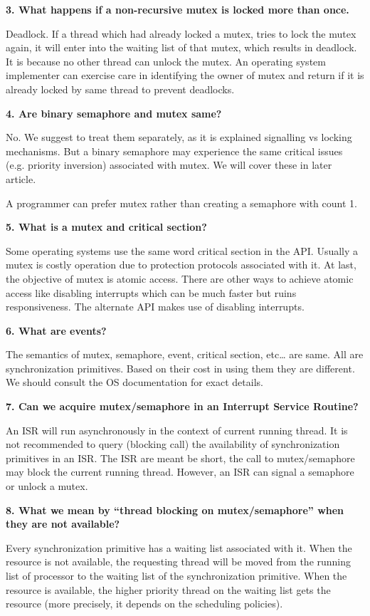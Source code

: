 \documentclass[8pt,landscape]{article}
\begin{document}
\begin{multicols}{3}
\begin{tiny}
\textbf{3. What happens if a non-recursive mutex is locked more than once.}

Deadlock. If a thread which had already locked a mutex, tries to lock the mutex again, it will enter into the waiting list of that mutex, which results in deadlock. It is because no other thread can unlock the mutex. An operating system implementer can exercise care in identifying the owner of mutex and return if it is already locked by same thread to prevent deadlocks.

\textbf{4. Are binary semaphore and mutex same?}

No. We suggest to treat them separately, as it is explained signalling vs locking mechanisms. But a binary semaphore may experience the same critical issues (e.g. priority inversion) associated with mutex. We will cover these in later article.

A programmer can prefer mutex rather than creating a semaphore with count 1.

\textbf{5. What is a mutex and critical section?}

Some operating systems use the same word critical section in the API. Usually a mutex is costly operation due to protection protocols associated with it. At last, the objective of mutex is atomic access. There are other ways to achieve atomic access like disabling interrupts which can be much faster but ruins responsiveness. The alternate API makes use of disabling interrupts.

\textbf{6. What are events?}

The semantics of mutex, semaphore, event, critical section, etc… are same. All are synchronization primitives. Based on their cost in using them they are different. We should consult the OS documentation for exact details.

\textbf{7. Can we acquire mutex/semaphore in an Interrupt Service Routine?}

An ISR will run asynchronously in the context of current running thread. It is not recommended to query (blocking call) the availability of synchronization primitives in an ISR. The ISR are meant be short, the call to mutex/semaphore may block the current running thread. However, an ISR can signal a semaphore or unlock a mutex.

\textbf{8. What we mean by “thread blocking on mutex/semaphore” when they are not available?}

Every synchronization primitive has a waiting list associated with it. When the resource is not available, the requesting thread will be moved from the running list of processor to the waiting list of the synchronization primitive. When the resource is available, the higher priority thread on the waiting list gets the resource (more precisely, it depends on the scheduling policies).


\end{tiny}
\end{multicols}
\end{document}
